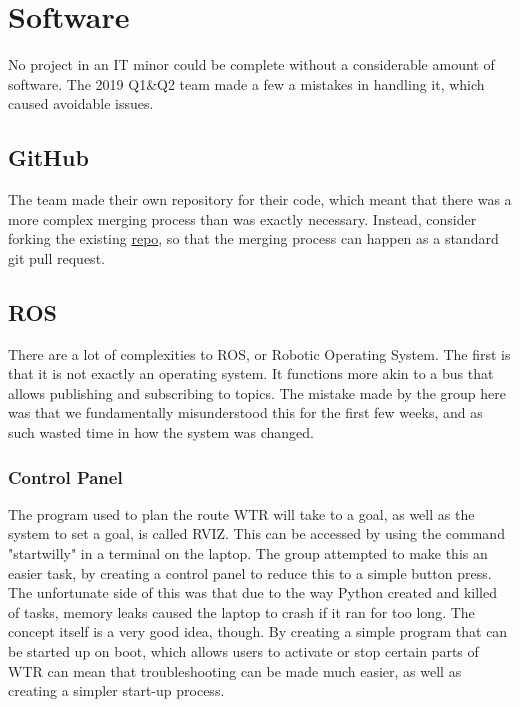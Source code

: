 \section{Software}
No project in an IT minor could be complete without a considerable amount of software.
The 2019 Q1\&Q2 team made a few a mistakes in handling it, which caused avoidable issues.

\subsection{GitHub}
The team made their own repository for their code, which meant that there was a more complex merging process than was exactly necessary.
Instead, consider forking the existing \href{https://github.com/Windesheim-Willy/}{repo}, so that the merging process can happen as a standard git pull request.

\subsection{ROS}
There are a lot of complexities to ROS, or Robotic Operating System.
The first is that it is not exactly an operating system.
It functions more akin to a bus that allows publishing and subscribing to topics.
The mistake made by the group here was that we fundamentally misunderstood this for the first few weeks, and as such wasted time in how the system was changed.

\subsubsection{Control Panel}
The program used to plan the route WTR will take to a goal, as well as the system to set a goal, is called RVIZ.
This can be accessed by using the command "startwilly" in a terminal on the laptop.
The group attempted to make this an easier task, by creating a control panel to reduce this to a simple button press.
The unfortunate side of this was that due to the way Python created and killed of tasks, memory leaks caused the laptop to crash if it ran for too long.
The concept itself is a very good idea, though.
By creating a simple program that can be started up on boot, which allows users to activate or stop certain parts of WTR can mean that troubleshooting can be made much easier, as well as creating a simpler start-up process.

